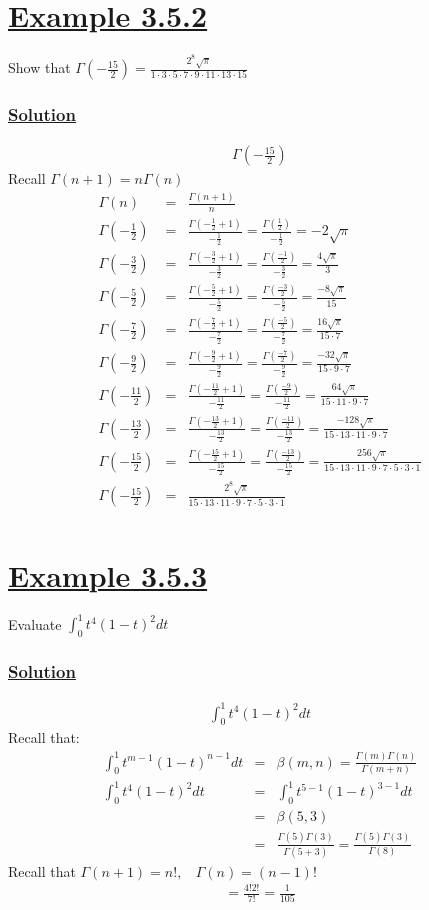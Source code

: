 \documentclass[11pt]{report}
\newcommand{\ubt}[1]{\textbf{\underline{#1}}}
\newcommand{\sps}{\\[0.2cm]}
\newcommand{\dsp}{\displaystyle}
\newcommand{\example}[1]{\section*{\ubt{Example #1}}}
\newcommand{\solution}{\subsubsection{\ubt{Solution}}}
\begin{document}
	\example{3.5.2}
	Show that $\dsp\Gamma\left(-\frac{15}{2}\right) = \frac{2^8\sqrt{\pi}}{1\cdot 3 \cdot 5 \cdot 7 \cdot 9 \cdot 11 \cdot 13 \cdot 15}$
	
	\solution
	\begin{eqnarray*}
		\Gamma\left(-\frac{15}{2}\right)
	\end{eqnarray*}
	Recall $\Gamma(n+1)=n\Gamma(n)$
	\begin{eqnarray*}
		\Gamma(n) &=& \frac{\Gamma(n+1)}{n}\sps
		\Gamma\left(-\frac{1}{2}\right) &=& \frac{\Gamma\left(-\frac{1}{2} + 1\right)}{-\frac{1}{2}} = \frac{\Gamma\left(\frac{1}{2}\right)}{-\frac{1}{2}} = -2\sqrt{\pi}\sps
		\Gamma\left(-\frac{3}{2}\right) &=& \frac{\Gamma\left(-\frac{3}{2} + 1\right)}{-\frac{3}{2}} = \frac{\Gamma\left(\frac{-1}{2}\right)}{-\frac{3}{2}} = \frac{4\sqrt{\pi}}{3}\sps
		\Gamma\left(-\frac{5}{2}\right) &=& \frac{\Gamma\left(-\frac{5}{2} + 1\right)}{-\frac{5}{2}} = \frac{\Gamma\left(\frac{-3}{2}\right)}{-\frac{5}{2}} = \frac{-8\sqrt{\pi}}{15}\sps
		\Gamma\left(-\frac{7}{2}\right) &=& \frac{\Gamma\left(-\frac{7}{2} + 1\right)}{-\frac{7}{2}} = \frac{\Gamma\left(\frac{-5}{2}\right)}{-\frac{7}{2}} = \frac{16\sqrt{\pi}}{15 \cdot 7}\sps
		\Gamma\left(-\frac{9}{2}\right) &=& \frac{\Gamma\left(-\frac{9}{2} + 1\right)}{-\frac{9}{2}} = \frac{\Gamma\left(\frac{-7}{2}\right)}{-\frac{9}{2}} = \frac{-32\sqrt{\pi}}{15 \cdot 9 \cdot 7}\sps
		\Gamma\left(-\frac{11}{2}\right) &=& \frac{\Gamma\left(-\frac{11}{2} + 1\right)}{-\frac{11}{2}} = \frac{\Gamma\left(\frac{-9}{2}\right)}{-\frac{11}{2}} = \frac{64\sqrt{\pi}}{15 \cdot 11 \cdot 9 \cdot 7}\sps
		\Gamma\left(-\frac{13}{2}\right) &=& \frac{\Gamma\left(-\frac{13}{2} + 1\right)}{-\frac{13}{2}} = \frac{\Gamma\left(\frac{-11}{2}\right)}{-\frac{13}{2}} = \frac{-128\sqrt{\pi}}{15 \cdot 13 \cdot 11 \cdot 9 \cdot 7}\sps
		\Gamma\left(-\frac{15}{2}\right) &=& \frac{\Gamma\left(-\frac{15}{2} + 1\right)}{-\frac{15}{2}} = \frac{\Gamma\left(\frac{-13}{2}\right)}{-\frac{15}{2}} = \frac{256\sqrt{\pi}}{15 \cdot 13 \cdot 11 \cdot 9 \cdot 7 \cdot 5 \cdot 3 \cdot 1}\sps
		\Gamma\left(-\frac{15}{2}\right) &=&  \frac{2^8\sqrt{\pi}}{15 \cdot 13 \cdot 11 \cdot 9 \cdot 7 \cdot 5 \cdot 3 \cdot 1}\sps
	\end{eqnarray*}
	
	
	\example{3.5.3}
	Evaluate $\dsp\int_0^1 t^4(1-t)^2dt$
	
	\solution
	\begin{eqnarray*}
		\int_0^1 t^4(1-t)^2dt
	\end{eqnarray*}
	Recall that:
	\begin{eqnarray*}
		\int_0^1 t^{m-1}(1-t)^{n-1}dt &=& \beta(m,n) = \frac{\Gamma(m)\Gamma(n)}{\Gamma(m+n)}\sps
		\int_0^1 t^4(1-t)^2dt &=& \int_0^1 t^{5-1}(1-t)^{3-1}dt\sps
		&=& \beta(5,3)\sps
		&=& \frac{\Gamma(5)\Gamma(3)}{\Gamma(5+3)} = \frac{\Gamma(5)\Gamma(3)}{\Gamma(8)}
	\end{eqnarray*}
	Recall that $\dsp \Gamma(n+1)=n!, ~~~~ \Gamma(n)=(n-1)!$
	\begin{eqnarray*}
		=\frac{4!2!}{7!} = \frac{1}{105}
	\end{eqnarray*}
	
\end{document}
